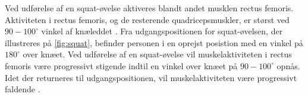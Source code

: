 Ved udførelse af en squat-øvelse aktiveres blandt andet musklen rectus femoris. Aktiviteten i rectus femoris, og de resterende quadricepsmuskler, er størst ved $90-100^{\circ}$ vinkel af knæleddet \citep{schoenfeld2010}. 
Fra udgangspositionen for squat-øvelsen, der illustreres på \autoref{fig:squat}, befinder personen i en oprejst posistion med en vinkel på $180^{\circ}$ over knæet. Ved udførelse af en squat-øvelse vil muskelaktiviteten i rectus femoris være progressivt stigende indtil en vinkel over knæet på $90-100^{\circ}$ opnås. Idet der returneres til udgangspositionen, vil muskelaktiviteten være progressivt faldende \citep{escamilla2001}. 




